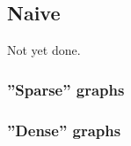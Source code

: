 \documentclass[a4paper]{article}
\begin{document}
% 
% 
\subsection{Naive}
Not yet done.

\subsubsection{''Sparse'' graphs}

\subsubsection{''Dense'' graphs}
\end{document}
